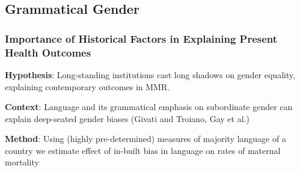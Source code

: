 \documentclass[10pt,letterpaper,subeqn]{beamer}
\begin{document}
\subsection{Grammatical Gender}
\begin{frame}
\frametitle{Importance of Historical Factors in Explaining Present Health Outcomes}
\textbf{Hypothesis}: Long-standing institutions cast long shadows on gender
equality, explaining contemporary outcomes in MMR. \\
\vspace{3mm}

\textbf{Context}: Language and its grammatical emphasis on subordinate gender can
explain deep-seated gender biases
(Givati and Troiano, Gay et al.)\\
\vspace{3mm}

\textbf{Method}: Using (highly pre-determined) measures of majority language of
a country we estimate effect of in-built bias in language on rates of maternal
mortality
\end{frame}
\end{document}
